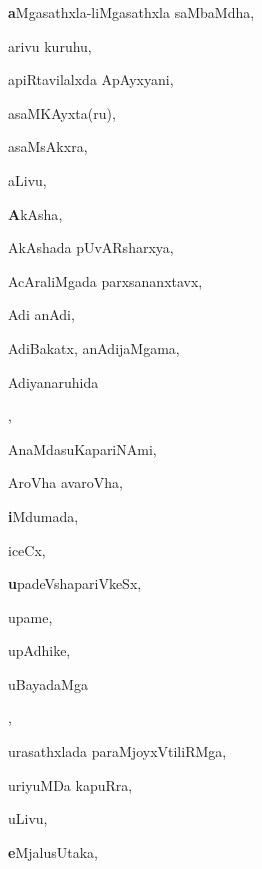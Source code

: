 \noindent
\begin{multicols}{3}
{\small

\noindent
{{\large\textbf{a}}Mgasathxla-liMgasathxla saMbaMdha}, \pageref{aMgasathxla-liMgasathxla saMbaMdha}

\noindent
{arivu kuruhu}, \pageref{arivu kuruhu}

\noindent
{apiRtavilalxda ApAyxyani}, \pageref{apiRtavilalxda ApAyxyani}

\noindent
{asaMKAyxta(ru)}, \pageref{asaMKAyxta(ru)}

\noindent
{asaMsAkxra}, \pageref{asaMsAkxra}

\noindent
{aLivu}, \pageref{aLivu}

\noindent
{{\large\textbf{A}}kAsha}, \pageref{AkAsha}

\noindent
{AkAshada pUvARsharxya}, \pageref{AkAshada pUvARsharxya}

\noindent
{AcAraliMgada parxsananxtavx}, \pageref{AcAraliMgada parxsananxtavx}

\noindent
{Adi anAdi}, \pageref{Adi anAdi}

\noindent
{AdiBakatx, anAdijaMgama}, \pageref{AdiBakatx, anAdijaMgama}

\noindent
{Adiyanaruhida} 

\noindent
{}, \pageref{Adiyanaruhida anAdiya toVridanu}

\noindent
{AnaMdasuKapariNAmi}, \pageref{AnaMdasuKapariNAmi}

\noindent
{AroVha avaroVha}, \pageref{AroVha avaroVha}

\noindent
{{\large\textbf{i}}Mdumada}, \pageref{iMdumada}

\noindent
{iceCx}, \pageref{iceCx}

\noindent
{{\large\textbf{u}}padeVshapariVkeSx}, \pageref{upadeVshapariVkeSx}

\noindent
{upame}, \pageref{upame}

\noindent
{upAdhike}, \pageref{upAdhike}

\noindent
{uBayadaMga}

\noindent
{}, \pageref{uBayadaMga EkiVkaravAguvudu}

\noindent
{urasathxlada paraMjoyxVtiliRMga}, \pageref{urasathxlada paraMjoyxVtiliRMga}

\noindent
{uriyuMDa kapuRra}, \pageref{uriyuMDa kapuRra}

\noindent
{uLivu}, \pageref{uLivu}

\noindent
{{\large\textbf{e}}MjalusUtaka}, \pageref{eMjalusUtaka}

}
\end{multicols}
